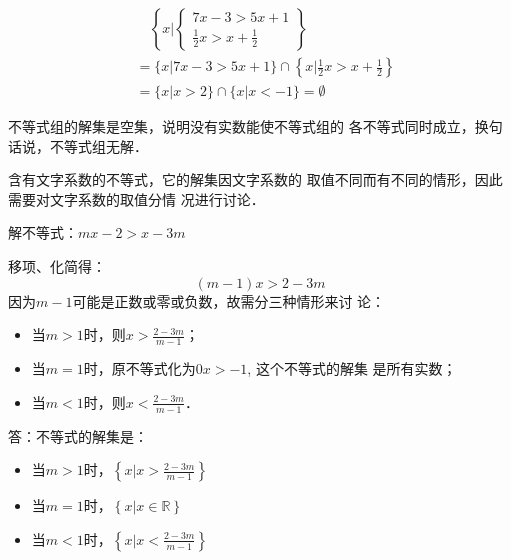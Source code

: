 \begin{solution}
 \[\begin{split}
&  \quad \left\{x\Big|\begin{cases}
    7x-3>5x+1\\
    \frac{1}{2}x>x+\frac{1}{2}
\end{cases} \right\}   \\
&=\{x|7x-3>5x+1 \}\cap\left\{x|\frac{1}{2}x>x+\frac{1}{2}\right\}\\
&=\{x|x>2\}\cap\{x|x<-1\}=\emptyset
 \end{split}\]  
\begin{figure}[htp]
    \centering
{}
    \caption{}
\end{figure}

 不等式组的解集是空集，说明没有实数能使不等式组的
各不等式同时成立，换句话说，不等式组无解．
\end{solution}

\begin{rmk}
    含有文字系数的不等式，它的解集因文字系数的
取值不同而有不同的情形，因此需要对文字系数的取值分情
况进行讨论．
\end{rmk}

\begin{example}
    解不等式：$mx-2>x-3m$
\end{example}

\begin{solution}
移项、化简得：
\[(m-1)x>2-3m\]
因为$m-1$可能是正数或零或负数，故需分三种情形来讨
论：
\begin{itemize}
    \item 当$m>1$时，则$x>\frac{2-3m}{m-1}$；
\item 当$m=1$时，原不等式化为$0x>-1$, 这个不等式的解集
是所有实数；
\item 当$m<1$时，则$x<\frac{2-3m}{m-1}$．
\end{itemize}

答：不等式的解集是：
\begin{itemize}
    \item 当$m>1$时，$\left\{x\Big| x>\frac{2-3m}{m-1}\right\}$
    \item 当$m=1$时，$\left\{x\Big| x\in\mathbb{R}\right\}$
    \item 当$m<1$时，$\left\{x\Big| x<\frac{2-3m}{m-1}\right\}$
\end{itemize}
\end{solution}

